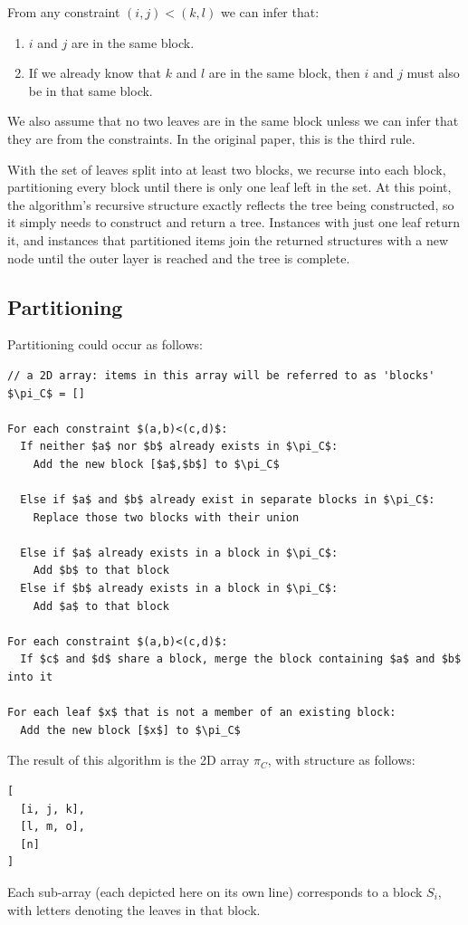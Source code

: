 \documentclass[11pt]{article} %
\begin{document}
From any constraint $(i,j)<(k,l)$ we can infer that:
\begin{enumerate}
	\item $i$ and $j$ are in the same block.
	\item If we already know that $k$ and $l$ are in the same block, then $i$ and $j$ must also be in that same block.
\end{enumerate}

We also assume that no two leaves are in the same block unless we can infer that they are from the constraints. In the original paper, this is the third rule.

With the set of leaves split into at least two blocks, we recurse into each block, partitioning every block until there is only one leaf left in the set. At this point, the algorithm's recursive structure exactly reflects the tree being constructed, so it simply needs to construct and return a tree. Instances with just one leaf return it, and instances that partitioned items join the returned structures with a new node until the outer layer is reached and the tree is complete.


\subsection{Partitioning}
Partitioning could occur as follows:
\begin{lstlisting}
// a 2D array: items in this array will be referred to as 'blocks'
$\pi_C$ = []

For each constraint $(a,b)<(c,d)$:
  If neither $a$ nor $b$ already exists in $\pi_C$:
    Add the new block [$a$,$b$] to $\pi_C$

  Else if $a$ and $b$ already exist in separate blocks in $\pi_C$:
    Replace those two blocks with their union

  Else if $a$ already exists in a block in $\pi_C$:
    Add $b$ to that block
  Else if $b$ already exists in a block in $\pi_C$:
    Add $a$ to that block

For each constraint $(a,b)<(c,d)$:
  If $c$ and $d$ share a block, merge the block containing $a$ and $b$ into it

For each leaf $x$ that is not a member of an existing block:
  Add the new block [$x$] to $\pi_C$
\end{lstlisting}

The result of this algorithm is the 2D array $\pi_C$, with structure as follows:
\begin{lstlisting}
[
  [i, j, k],
  [l, m, o],
  [n]
]
\end{lstlisting}
Each sub-array (each depicted here on its own line) corresponds to a block $S_i$, with letters denoting the leaves in that block.
\end{document}
